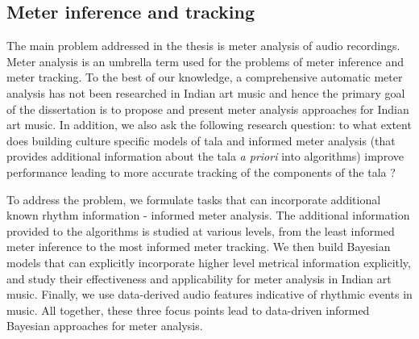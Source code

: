 \subsection{Meter inference and tracking}\label{sec:probdef:thesismeter}
The main problem addressed in the thesis is meter analysis of audio recordings. Meter analysis is an umbrella term used for the problems of meter inference and meter tracking. To the best of our knowledge, a comprehensive automatic meter analysis has not been researched in Indian art music and hence the primary goal of the dissertation is to propose and present meter analysis approaches for Indian art music. In addition, we also ask the following research question: to what extent does building culture specific models of \gls{tala} and informed meter analysis (that provides additional information about the \gls{tala} \textit{a priori} into algorithms) improve performance leading to more accurate tracking of the components of the \gls{tala} ?

To address the problem, we formulate tasks that can incorporate additional known rhythm information - informed meter analysis. The additional information provided to the algorithms is studied at various levels, from the least informed meter inference to the most informed meter tracking. We then build Bayesian models that can explicitly incorporate higher level metrical information explicitly, and study their effectiveness and applicability for meter analysis in Indian art music. Finally, we use data-derived audio features indicative of rhythmic events in music. All together, these three focus points lead to data-driven informed Bayesian approaches for meter analysis. 

